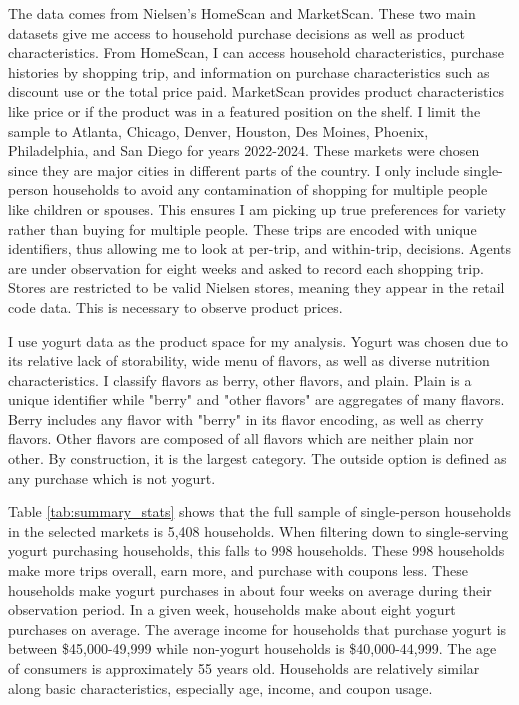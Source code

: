 \documentclass[11pt]{article}
\theoremstyle{definition}
\theoremstyle{remark}
\begin{document}
    The data comes from Nielsen's HomeScan and MarketScan. These two main datasets give me access to household purchase decisions as well as product characteristics. From HomeScan, I can access household characteristics, purchase histories by shopping trip, and information on purchase characteristics such as discount use or the total price paid. MarketScan provides product characteristics like price or if the product was in a featured position on the shelf. I limit the sample to Atlanta, Chicago, Denver, Houston, Des Moines, Phoenix, Philadelphia, and San Diego for years 2022-2024. These markets were chosen since they are major cities in different parts of the country. I only include single-person households to avoid any contamination of shopping for multiple people like children or spouses. This ensures I am picking up true preferences for variety rather than buying for multiple people. These trips are encoded with unique identifiers, thus allowing me to look at per-trip, and within-trip, decisions. Agents are under observation for eight weeks and asked to record each shopping trip. Stores are restricted to be valid Nielsen stores, meaning they appear in the retail code data. This is necessary to observe product prices.

    I use yogurt data as the product space for my analysis. Yogurt was chosen due to its relative lack of storability, wide menu of flavors, as well as diverse nutrition characteristics. I classify flavors as berry, other flavors, and plain. Plain is a unique identifier while "berry" and "other flavors" are aggregates of many flavors. Berry includes any flavor with "berry" in its flavor encoding, as well as cherry flavors. Other flavors are composed of all flavors which are neither plain nor other. By construction, it is the largest category. The outside option is defined as any purchase which is not yogurt.

    Table \ref{tab:summary_stats} shows that the full sample of single-person households in the selected markets is 5,408 households. When filtering down to single-serving yogurt purchasing households, this falls to 998 households. These 998 households make more trips overall, earn more, and purchase with coupons less. These households make yogurt purchases in about four weeks on average during their observation period. In a given week, households make about eight yogurt purchases on average. The average income for households that purchase yogurt is between \$45,000-49,999 while non-yogurt households is \$40,000-44,999. The age of consumers is approximately 55 years old. Households are relatively similar along basic characteristics, especially age, income, and coupon usage.
\end{document}
